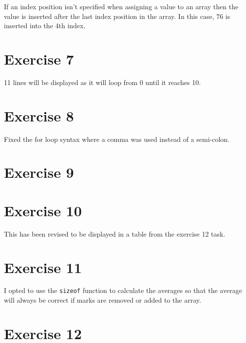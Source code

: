 If an index position isn't specified when assigning a value to an array then the value is inserted after the last index position in the array. In this case, $76$ is inserted into the 4th index.


\captionsetup{type=figure}

\section{Exercise 7}

11 lines will be displayed as it will loop from 0 until it reaches 10.


\captionsetup{type=figure}

\section{Exercise 8}

Fixed the for loop syntax where a comma was used instead of a semi-colon.


\captionsetup{type=figure}

\section{Exercise 9}


\captionsetup{type=figure}

\section{Exercise 10}

This has been revised to be displayed in a table from the exercise 12 task.


\captionsetup{type=figure}

\section{Exercise 11}

I opted to use the \texttt{sizeof} function to calculate the averages so that the average will always be correct if marks are removed or added to the array.


\captionsetup{type=figure}

\section{Exercise 12}


\captionsetup{type=figure}
